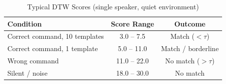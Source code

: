 \begin{table}[H]
\caption{Typical DTW Scores (single speaker, quiet environment)}
\centering
\begin{tabular}{lcc}
\toprule
\textbf{Condition} & \textbf{Score Range} & \textbf{Outcome} \\
\midrule
Correct command, 10 templates & 3.0 -- 7.5   & Match ($<\tau$)      \\
Correct command, 1 template   & 5.0 -- 11.0  & Match / borderline   \\
Wrong command                 & 11.0 -- 22.0 & No match ($>\tau$)   \\
Silent / noise                & 18.0 -- 30.0 & No match             \\
\bottomrule
\end{tabular}
\label{tab:results}
\end{table}